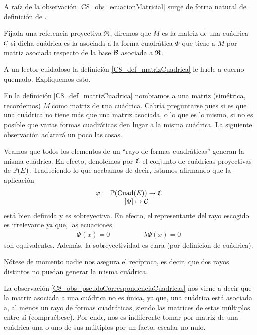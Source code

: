 A raíz de la observación \ref{C8_obs_ecuacionMatricial} surge de forma natural de definición de .
\begin{defi}
	\label{C8_def_matrizCuadrica}
	Fijada una referencia proyectiva $\mathfrak{R}$, diremos que $M$ es la matriz de una cuádrica $\mathcal{C}$ si dicha cuádrica es la asociada a la forma cuadrática $\Phi$ que tiene a $M$ por matriz asociada respecto de la base $\mathcal{B}$ asociada a $\mathfrak{R}$.
\end{defi}
A un lector cuidadoso la definición \ref{C8_def_matrizCuadrica} le huele a cuerno quemado. Expliquemos esto.

En la definición \ref{C8_def_matrizCuadrica} nombramos a una matriz (simétrica, recordemos) $M$ como  matriz de una cuádrica. Cabría preguntarse pues si es que una cuádrica no tiene más que una matriz asociada, o lo que es lo mismo, si no es posible que varias formas cuadráticas den lugar a la misma cuádrica. La siguiente observación aclarará un poco las cosas.
\begin{obs}
	\label{C8_obs_pseudoCorrespondenciaCuadricas}
	Veamos que todos los elementos de un ``rayo de formas cuadráticas'' generan la misma cuádrica. En efecto, denotemos por $\mathfrak{C}$ el conjunto de cuádricas proyectivas de $\mathbb{P}(E)$. Traduciendo lo que acabamos de decir, estamos afirmando que la aplicación
	\[\begin{array}{cc}
	\varphi:&\mathbb{P}(\mathrm{Cuad}(E))\to\mathfrak{C}\\
	& \left [ \Phi \right ]\mapsto \mathcal{C}
	\end{array}\] está bien definida y es sobreyectiva. En efecto, el representante del rayo escogido es irrelevante ya que, las ecuaciones
	\[\begin{array}{cc}
	\Phi(x)=0\qquad&\qquad\lambda\Phi(x)=0
	\end{array}\]
	son equivalentes. Además, la sobreyectividad es clara (por definición de cuádrica).
	
	 Nótese de momento nadie nos asegura el recíproco, es decir, que dos rayos distintos no puedan generar la misma cuádrica.
\end{obs}
La observación \ref{C8_obs_pseudoCorrespondenciaCuadricas} nos viene a decir que la matriz asociada a una cuádrica no es única, ya que, una cuádrica está asociada a, al menos un rayo de formas cuadráticas, siendo las matrices de estas múltiplos entre sí (compruébese). Por ende, nos es indiferente tomar por matriz de una cuádrica una o uno de sus múltiplos por un factor escalar no nulo.

